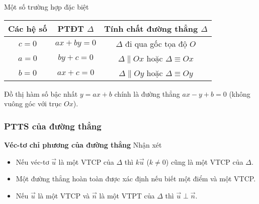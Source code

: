  Một số trường hợp đặc biệt
	\begin{center}
		\renewcommand{\arraystretch}{2}%
		\begin{tabular}{|c|c|c|}
			\hline 
			Các hệ số & PTĐT $\Delta$ & Tính chất đường thẳng $\Delta$ \\ 
			\hline 
			$c=0$ & $ax+by =0$ & $\Delta$ đi qua gốc tọa độ $O$ \\ 
			\hline 
			$a=0$ & $by+c=0$ & $\Delta \parallel Ox$ hoặc $\Delta  \equiv Ox$ \\ 
			\hline 
			$b=0$ & $ax+c=0$ &  $\Delta \parallel Oy$ hoặc $\Delta  \equiv Oy$ \\ 
			\hline 
		\end{tabular} 
	\end{center}


\begin{note}
	Đồ thị hàm số bậc nhất $y=ax+b$ chính là đường thẳng $ax-y+b=0$ (không vuông góc với trục $Ox$).
\end{note}

\subsubsection{PTTS của đường thẳng}
\textbf{Véc-tơ chỉ phương của đường thẳng}
		Nhận xét 
		\begin{itemize}
			\item Nếu véc-tơ $\overrightarrow{u}$  là một VTCP của $\Delta$ thì $k \overrightarrow{u}$ ($k \ne 0 $) cũng là một VTCP của $\Delta$. 
			\item Một đường thẳng hoàn toàn được xác định nếu biết một điểm và một VTCP.
			\item Nếu $\overrightarrow{u}$ là một VTCP và $\overrightarrow{n}$ là một VTPT của $\Delta$ thì $\overrightarrow{u} \perp \overrightarrow{n}$.
		\end{itemize}


